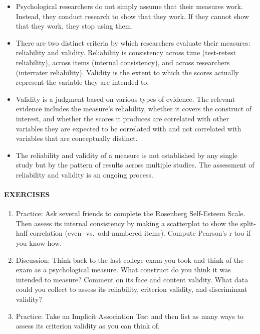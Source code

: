 \documentclass[
]{krantz}
\providecommand{\tightlist}{%
  \setlength{\itemsep}{0pt}\setlength{\parskip}{0pt}}
\begin{document}
\begin{itemize}
\tightlist
\item
  Psychological researchers do not simply assume that their measures work. Instead, they conduct research to show that they work. If they cannot show that they work, they stop using them.
\item
  There are two distinct criteria by which researchers evaluate their measures: reliability and validity. Reliability is consistency across time (test-retest reliability), across items (internal consistency), and across researchers (interrater reliability). Validity is the extent to which the scores actually represent the variable they are intended to.
\item
  Validity is a judgment based on various types of evidence. The relevant evidence includes the measure's reliability, whether it covers the construct of interest, and whether the scores it produces are correlated with other variables they are expected to be correlated with and not correlated with variables that are conceptually distinct.
\item
  The reliability and validity of a measure is not established by any single study but by the pattern of results across multiple studies. The assessment of reliability and validity is an ongoing process.
\end{itemize}

\hypertarget{exercises-14}{%
\paragraph*{EXERCISES}\label{exercises-14}}

\begin{enumerate}
\def\labelenumi{\arabic{enumi}.}
\tightlist
\item
  Practice: Ask several friends to complete the Rosenberg Self-Esteem Scale. Then assess its internal consistency by making a scatterplot to show the split-half correlation (even- vs.~odd-numbered items). Compute Pearson's r too if you know how.
\item
  Discussion: Think back to the last college exam you took and think of the exam as a psychological measure. What construct do you think it was intended to measure? Comment on its face and content validity. What data could you collect to assess its reliability, criterion validity, and discriminant validity?
\item
  Practice: Take an Implicit Association Test and then list as many ways to assess its criterion validity as you can think of.
\end{enumerate}
\end{document}
